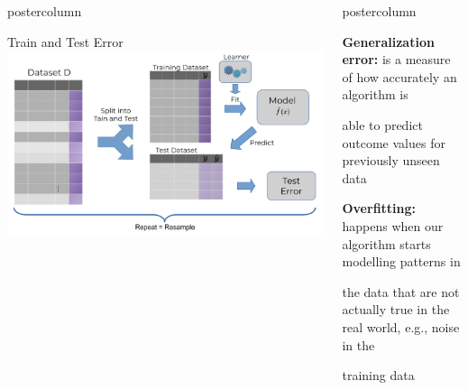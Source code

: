 \documentclass{beamer}
\newlength{\columnheight} %
\begin{document}
\begin{frame}[fragile]{}
\begin{columns}
\begin{column}{.31\textwidth}
\begin{beamercolorbox}[center]{postercolumn}
\begin{minipage}{.98\textwidth}
{\begin{myblock}{Train and Test Error}
    \hspace*{1ex}
    \vspace*{1ex}	
    \includegraphics[width=1\columnwidth]{img/test_error.png}
    \end{myblock}
  }
  \end{minipage}
  \end{beamercolorbox}
  \end{column}
  
  \begin{column}{.31\textwidth}
  \begin{beamercolorbox}[center]{postercolumn}
  \begin{minipage}{.98\textwidth}
  \parbox[t][\columnheight]{\textwidth}{
    \begin{myblock}{ }
    \begin{codebox}
    \textbf{Generalization error: }is a measure of how accurately an algorithm is
    \end{codebox}
    
    \begin{codebox}
    able to predict outcome values for previously unseen data
    \end{codebox}
    
    \vspace*{1ex}
    
    \begin{codebox}
    \textbf{Overfitting: }happens when our algorithm starts modelling patterns in
    \end{codebox}
    \begin{codebox}
    the data that are not actually true in the real world, e.g., noise in the
    \end{codebox}
    \begin{codebox}
    training data
    \end{codebox}
    

\end{myblock}}
\end{minipage}
\end{beamercolorbox}
\end{column}
\end{columns}
\end{frame}
\end{document}
